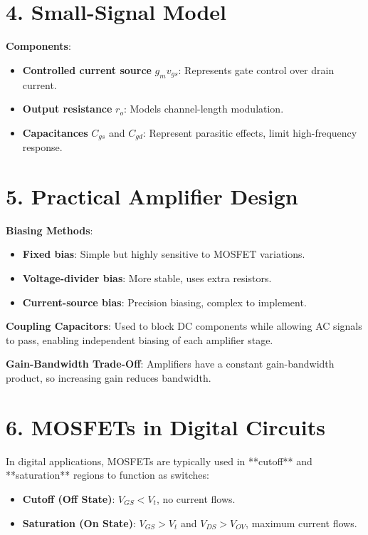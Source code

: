 \documentclass[10pt]{article}
\begin{document}
\begin{multicols}{2}
\section*{4. Small-Signal Model}
\textbf{Components}:
\begin{itemize}[noitemsep]
    \item \textbf{Controlled current source} \(g_m v_{gs}\): Represents gate control over drain current.
    \item \textbf{Output resistance} \(r_o\): Models channel-length modulation.
    \item \textbf{Capacitances} \(C_{gs}\) and \(C_{gd}\): Represent parasitic effects, limit high-frequency response.
\end{itemize}

\section*{5. Practical Amplifier Design}
\textbf{Biasing Methods}:
\begin{itemize}[noitemsep]
    \item \textbf{Fixed bias}: Simple but highly sensitive to MOSFET variations.
    \item \textbf{Voltage-divider bias}: More stable, uses extra resistors.
    \item \textbf{Current-source bias}: Precision biasing, complex to implement.
\end{itemize}

\textbf{Coupling Capacitors}: Used to block DC components while allowing AC signals to pass, enabling independent biasing of each amplifier stage.

\textbf{Gain-Bandwidth Trade-Off}: Amplifiers have a constant gain-bandwidth product, so increasing gain reduces bandwidth.

\section*{6. MOSFETs in Digital Circuits}
In digital applications, MOSFETs are typically used in **cutoff** and **saturation** regions to function as switches:
\begin{itemize}[noitemsep]
    \item \textbf{Cutoff (Off State)}: \(V_{GS} < V_t\), no current flows.
    \item \textbf{Saturation (On State)}: \(V_{GS} > V_t\) and \(V_{DS} > V_{OV}\), maximum current flows.
\end{itemize}


\end{multicols}
\end{document}
